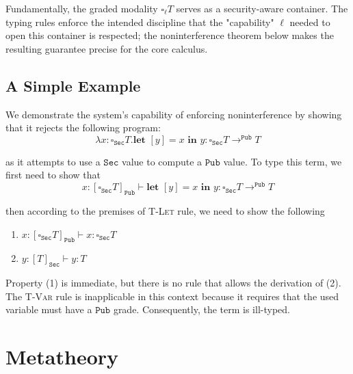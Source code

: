 \documentclass[conference]{IEEEtran}
\newcommand\lam[2]{\lambda #1.#2}
\newcommand\gradedt[2]{\square_{#1} #2}
\newcommand\public{\texttt{Pub}}
\newcommand\secret{\texttt{Sec}}
\begin{document}
Fundamentally, the graded modality $\gradedt{\ell}{T}$ serves as a security-aware container. The typing rules enforce the intended discipline that the "capability" $\ell$ needed to open this container is respected; the noninterference theorem below makes the resulting guarantee precise for the core calculus.

\subsection{A Simple Example}

We demonstrate the system's capability of enforcing noninterference by showing that it rejects the following program:
$$
\lam{x:\gradedt{\secret}{T}}{\textbf{let }[y]=x\textbf{ in }y}:\gradedt{\secret}{T}\to^\public T
$$

as it attempts to use a $\secret$ value to compute a $\public$ value. To type this term, we first need to show that
$$
x:[\gradedt{\secret}{T}]_\public\vdash \textbf{let }[y]=x\textbf{ in }y:\gradedt{\secret}{T}\to^\public T
$$

then according to the premises of \textsc{T-Let} rule, we need to show the following
\begin{enumerate}
	\item $x:[\gradedt{\secret}{T}]_\public\vdash x:\gradedt{\secret}{T}$ 
	\item $y:[T]_\secret\vdash y:T$
\end{enumerate}

Property (1) is immediate, but there is no rule that allows the derivation of (2). The \textsc{T-Var} rule is inapplicable in this context because it requires that the used variable must have a $\public$ grade. Consequently, the term is ill-typed.

\section{Metatheory}
\end{document}
